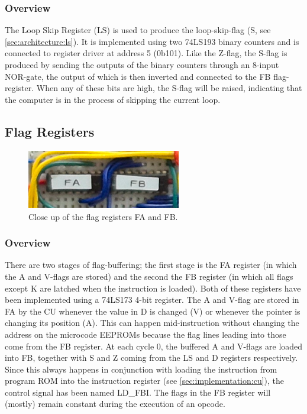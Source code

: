\subsubsection{Overview}
The Loop Skip Register (LS) is used to produce the loop-skip-flag (S, see \ref{sec:architecture:ls}). It is implemented using two 74LS193 binary counters and is connected to register driver at address 5 (0b101). Like the Z-flag, the S-flag is produced by sending the outputs of the binary counters through an 8-input NOR-gate, the output of which is then inverted and connected to the FB flag-register. When any of these bits are high, the S-flag will be raised, indicating that the computer is in the process of skipping the current loop.



\newpage\subsection{Flag Registers}
\begin{figure}[H]
  \centering
  \includegraphics[width=0.6\textwidth]{img/flagregistercloseup}
  \caption{Close up of the flag registers FA and FB.}
  \label{fig:ramcloseup}
\end{figure}

\subsubsection{Overview}
There are two stages of flag-buffering; the first stage is the FA register (in which the A and V-flags are stored) and the second the FB register (in which all flags except K are latched when the instruction is loaded). Both of these registers have been implemented using a 74LS173 4-bit register. The A and V-flag are stored in FA by the CU whenever the value in D is changed (V) or whenever the pointer is changing its position (A). This can happen mid-instruction without changing the address on the microcode EEPROMs because the flag lines leading into those come from the FB register. At each cycle 0, the buffered A and V-flags are loaded into FB, together with S and Z coming from the LS and D registers respectively. Since this always happens in conjunction with loading the instruction from program ROM into the instruction register (see \ref{sec:implementation:cu}), the control signal has been named LD\_FBI. The flags in the FB register will (mostly) remain constant during the execution of an opcode.


